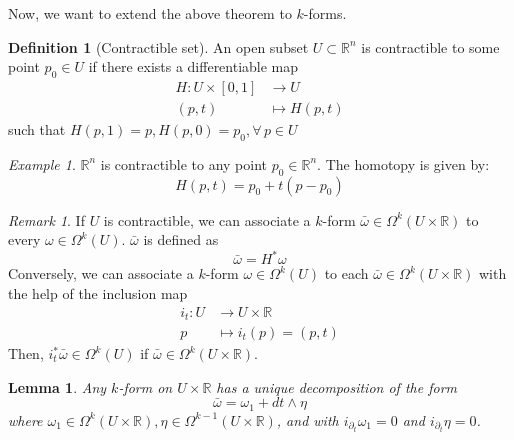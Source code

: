 \documentclass[a4paper,11pt,titlepage, article, oneside]{memoir}
\numberwithin{equation}{section}
\newtheorem{lemma}[theorem]{Lemma}
\theoremstyle{definition}
\newtheorem{definition}[theorem]{Definition}
\theoremstyle{remark}
\newtheorem{remark}[theorem]{Remark}
\newtheorem{example}[theorem]{Example}
\newcommand{\rfield}{\mathbb{R}}
\begin{document}
Now, we want to extend the above theorem to $k$-forms.

\begin{definition} [Contractible set]
  An open subset $U \subset \rfield^n$ is contractible to some point $p_0 \in U$ if there exists a differentiable map
  \begin{align}
    H \colon U \times [0, 1] &\rightarrow U \\
    (p,t) &\mapsto H(p, t) \nonumber
  \end{align}
  such that $H(p, 1) = p, H(p, 0) = p_0, \forall\, p \in U$
\end{definition}

\begin{tcolorbox}\begin{example}
$\rfield^n$ is contractible to any point $p_0 \in \rfield^n$. The homotopy is given by:
$$H(p, t) = p_0 + t(p- p_0)$$
\end{example}\end{tcolorbox}

\begin{remarkbox}\begin{remark}
  If $U$ is contractible, we can associate a $k$-form $\bar\omega \in \Omega^k(U \times \rfield)$ to every $\omega \in \Omega^k(U)$. $\bar \omega$ is defined as
  \begin{equation}
    \bar\omega = H^* \omega
  \end{equation}
  Conversely, we can associate a $k$-form $\omega \in \Omega^k(U)$ to each $\bar \omega \in \Omega^k(U \times \rfield)$ with the help of the inclusion map
  \begin{align}
    i_t \colon U &\rightarrow U \times \rfield \\
    p &\mapsto i_t(p) = (p,t)\nonumber
  \end{align}
  Then, $i_t^* \bar \omega \in \Omega^k(U)$ if $\bar \omega \in \Omega^k(U \times \rfield)$.
 \end{remark}\end{remarkbox}
 
 \begin{lemma}   \label{lemmaform1}
  Any $k$-form on $U \times \rfield$ has a unique decomposition of the form
  \begin{equation}
    \bar \omega = \omega_1 + dt \wedge \eta
  \end{equation}
  where $\omega_1 \in \Omega^k(U \times \rfield), \eta \in \Omega^{k-1}(U \times \rfield)$, and with $i_{\partial_t} \omega_1 = 0$ and $i_{\partial_t} \eta = 0$.
  \end{lemma}
\end{document}
